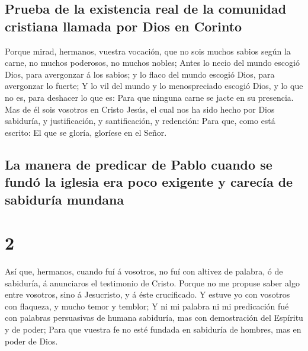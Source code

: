 \hypertarget{prueba-de-la-existencia-real-de-la-comunidad-cristiana-llamada-por-dios-en-corinto}{%
\subsection{Prueba de la existencia real de la comunidad cristiana
llamada por Dios en
Corinto}\label{prueba-de-la-existencia-real-de-la-comunidad-cristiana-llamada-por-dios-en-corinto}}

 Porque mirad, hermanos, vuestra vocación, que no sois
muchos sabios según la carne, no muchos poderosos, no muchos nobles;
 Antes lo necio del mundo escogió Dios, para avergonzar á
los sabios; y lo flaco del mundo escogió Dios, para avergonzar lo
fuerte;  Y lo vil del mundo y lo menospreciado escogió
Dios, y lo que no es, para deshacer lo que es:  Para que
ninguna carne se jacte en su presencia.  Mas de él sois
vosotros en Cristo Jesús, el cual nos ha sido hecho por Dios sabiduría,
y justificación, y santificación, y redención:  Para que,
como está escrito: El que se gloría, gloríese en el Señor.

\hypertarget{la-manera-de-predicar-de-pablo-cuando-se-funduxf3-la-iglesia-era-poco-exigente-y-carecuxeda-de-sabiduruxeda-mundana}{%
\subsection{La manera de predicar de Pablo cuando se fundó la iglesia
era poco exigente y carecía de sabiduría
mundana}\label{la-manera-de-predicar-de-pablo-cuando-se-funduxf3-la-iglesia-era-poco-exigente-y-carecuxeda-de-sabiduruxeda-mundana}}

\hypertarget{section-1}{%
\section{2}\label{section-1}}

 Así que, hermanos, cuando fuí á vosotros, no fuí con
altivez de palabra, ó de sabiduría, á anunciaros el testimonio de
Cristo.  Porque no me propuse saber algo entre vosotros,
sino á Jesucristo, y á éste crucificado.  Y estuve yo con
vosotros con flaqueza, y mucho temor y temblor;  Y ni mi
palabra ni mi predicación fué con palabras persuasivas de humana
sabiduría, mas con demostración del Espíritu y de poder; 
Para que vuestra fe no esté fundada en sabiduría de hombres, mas en
poder de Dios.

